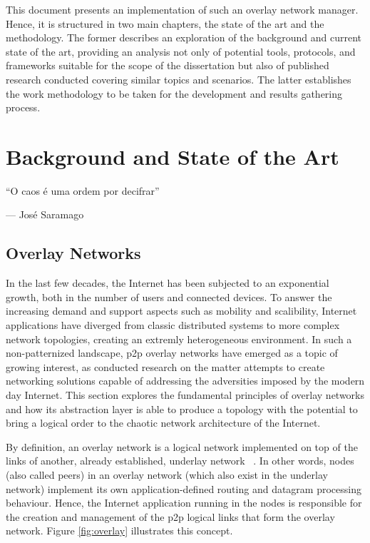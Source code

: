 \documentclass[11pt,twoside,a4paper]{report}
\begin{document}
This document presents an implementation of such an overlay network manager. Hence, it is structured in two main chapters, the state of the art and the methodology. The former describes an exploration of the background and current state of the art, providing an analysis not only of potential tools, protocols, and frameworks suitable for the scope of the dissertation but also of published research conducted covering similar topics and scenarios. The latter establishes the work methodology to be taken for the development and results gathering process.


\cleardoublepage

\chapter{Background and State of the Art}
\label{chapter:sota}

\begin{minipage}{80mm}
     \centering %
     ``O caos é uma ordem por decifrar''
          \begin{flushright}
          --- José Saramago
          \end{flushright}
     \end{minipage}


\section{Overlay Networks}
\label{sec:on}

In the last few decades, the Internet has been subjected to an exponential growth, both in the number of users and connected devices. To answer the increasing demand and support aspects such as mobility and scalibility, Internet applications have diverged from classic distributed systems to more complex network topologies, creating an extremly heterogeneous environment. In such a non-patternized landscape, \ac{p2p} overlay networks have emerged as a topic of growing interest, as conducted research on the matter attempts to create networking solutions capable of addressing the adversities imposed by the modern day Internet. This section explores the fundamental principles of overlay networks and how its abstraction layer is able to produce a topology with the potential to bring a logical order to  the chaotic network architecture of the Internet.

By definition, an overlay network is a logical network implemented on top of the links of another, already established, underlay network ~\cite{livronet}. In other words, nodes (also called peers) in an overlay network (which also exist in the underlay network) implement its own application-defined routing and datagram processing behaviour. Hence, the Internet application running in the nodes is responsible for the creation and management of the \ac{p2p} logical links that form the overlay network. Figure \ref{fig:overlay} illustrates this concept.
\end{document}
